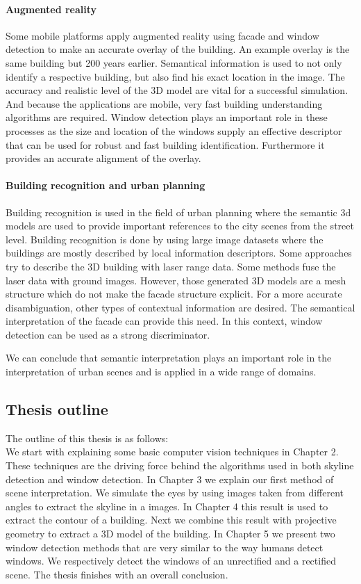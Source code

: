 \paragraph{Augmented reality}
	Some mobile platforms apply augmented reality using facade and window
	detection to make an accurate overlay of the building. An example overlay is
	the same building but 200 years earlier.  Semantical information is used to
	not only identify a respective building, but also find his exact location in
	the image.  The accuracy and realistic level of the 3D model are vital for a
	successful simulation.  And because the applications are mobile, very fast
	building understanding algorithms are required.  Window detection plays an
	important role in these processes as the size and location of the windows
	supply an effective descriptor that can be used for robust and fast building
	identification.  Furthermore it provides an accurate alignment of the
	overlay.

\paragraph{Building recognition and urban planning}
	Building recognition is used in the field of urban planning where the
	semantic 3d models are used to provide important references to the city
	scenes from the street level.  Building recognition is done by using large
	image datasets where the buildings are mostly described by local information
	descriptors.  Some approaches try to describe the 3D building with laser
	range data. Some methods fuse the laser data with ground images. However,
	those generated 3D models are a mesh structure which do not make the facade
	structure explicit.  For a more accurate disambiguation, other types of
	contextual information are desired.  The semantical interpretation of the
	facade can provide this need.  In this context, window detection can be used
	as a strong discriminator.

We can conclude that semantic interpretation plays an important role in the
interpretation of urban scenes and is applied in a wide range of domains.  

\subsection{Thesis outline}
The outline of this thesis is as follows:\\ We start with explaining some basic
computer vision techniques in Chapter 2.  These techniques are the driving force
behind the algorithms used in both skyline detection and window detection.  In
Chapter 3 we explain our first method of scene interpretation.  We simulate the
eyes by using images taken from different angles to extract the skyline in a
images.  In Chapter 4 this result is used to extract the contour of a building.
Next we combine this result with projective geometry to extract a 3D model of
the building.  In Chapter 5 we present two window detection methods that are
very similar to the way humans detect windows. We respectively detect the
windows of an unrectified and a rectified scene. The thesis finishes with an overall conclusion.  \\  

